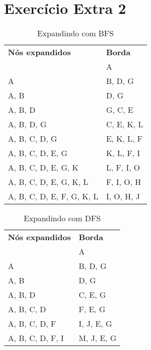 \documentclass[12pt,letterpaper]{article}
\begin{document}
	\section*{Exercício Extra 2}
	
	\newpage
	
	\begin{table}[]
		\centering
		\caption{Expandindo com BFS}
		\label{my-label}
		\begin{tabular}{l|l}
			\textbf{Nós expandidos}      & \textbf{Borda} \\ \cline{1-2}
			                             & A              \\ \cline{1-2}
			A                            & B, D, G        \\ \cline{1-2}
			A, B                         & D, G           \\ \cline{1-2}
			A, B, D                      & G, C, E        \\ \cline{1-2}
			A, B, D, G                   & C, E, K, L     \\ \cline{1-2}
			A, B, C, D, G                & E, K, L, F     \\ \cline{1-2}
			A, B, C, D, E, G             & K, L, F, I     \\ \cline{1-2}
			A, B, C, D, E, G, K          & L, F, I, O     \\ \cline{1-2}
			A, B, C, D, E, G, K, L       & F, I, O, H     \\ \cline{1-2}
			A, B, C, D, E, F, G, K, L    & I, O, H, J     \\ 
		\end{tabular}
	\end{table}

	\begin{table}[]
		\centering
		\caption{Expandindo com DFS}
		\label{my-label}
		\begin{tabular}{l|l}
			\textbf{Nós expandidos}      & \textbf{Borda} \\ \cline{1-2}
			                             & A              \\ \cline{1-2}
			A                            & B, D, G        \\ \cline{1-2}
			A, B                         & D, G           \\ \cline{1-2}
			A, B, D                      & C, E, G        \\ \cline{1-2}
			A, B, C, D                   & F, E, G        \\ \cline{1-2}
			A, B, C, D, F                & I, J, E, G     \\ \cline{1-2}
			A, B, C, D, F, I             & M, J, E, G     \\ 
		\end{tabular}
	\end{table}
			 
\end{document}

